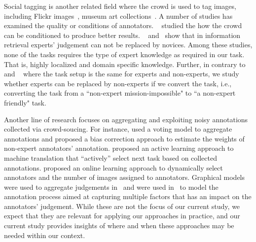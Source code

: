 
Social tagging is another related field where the crowd is used to tag images, including Flickr images~\cite{sigurbjornsson2008flickr}, 
museum art collections~\cite{trant2006exploring}. 
A number of studies has examined the quality or conditions of annotators. 
~\citet{theodosiou2011evaluating} studied the how the crowd can be conditioned to produce better results. 
~\citet{Kazai:2012:ASJ} and~\citet{Bailey08relevanceassessment} show that in information retrieval experts' judgement 
can not be replaced by novices. 
%
Among these studies, none of the tasks requires the type of expert knowledge as required in our task. 
That is, highly localized and domain specific knowledge. 
%
Further, in contrary to~\citet{Kazai:2012:ASJ} and ~\citet{Bailey08relevanceassessment} where the task setup is the same
for experts and non-experts, we study whether experts can be replaced by non-experts if we convert the task, i.e., 
converting the task from a ``non-expert mission-impossible" to ``a non-expert friendly" task. 

%
Another line of research focuses on aggregating and exploiting noisy annotations collected
via crowd-soucing. %
For instance, %
\citet{Snow:2008} used a voting model to aggregate annotations
and proposed a bias correction approach to estimate the weights of non-expert annotators' annotation. 
%
\citet{AMBATI10.244} proposed an active learning
approach to machine translation that ``actively'' select next task based on collected annotations. 
\citet{Welinder:2010oc} proposed an online learning approach to dynamically select
annotators and the number of images assigned to annotators. 
Graphical models were used to aggregate judgements in~\cite{Hoss12:aggr}
and were used in~\cite{Welinder:2010fk} to model the annotation process
aimed at capturing multiple factors that has an impact on the 
annotators' judgement. 
%
While these are not the focus of our current study, 
we expect that they are relevant for applying
our approaches in practice, and our current study provides insights of where and when 
these approaches may be needed within our context.

